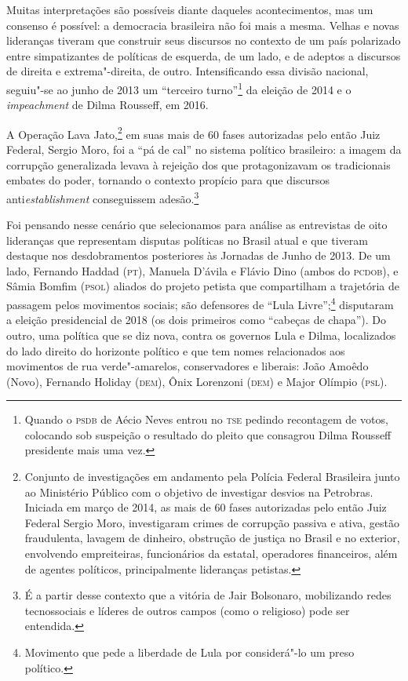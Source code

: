 Muitas interpretações são possíveis diante daqueles acontecimentos, mas
um consenso é possível: a democracia brasileira não foi mais a mesma.
Velhas e novas lideranças tiveram que construir seus discursos no
contexto de um país polarizado entre simpatizantes de políticas de
esquerda, de um lado, e de adeptos a discursos de direita e
extrema"-direita, de outro. Intensificando essa divisão nacional,
seguiu"-se ao junho de 2013 um ``terceiro turno''\footnote{Quando o \textsc{psdb} de
  Aécio Neves entrou no \textsc{tse} pedindo recontagem de votos, colocando sob
  suspeição o resultado do pleito que consagrou Dilma Rousseff
  presidente mais uma vez.} da eleição de 2014 e o \emph{impeachment}
de Dilma Rousseff, em 2016.

A Operação Lava Jato,\footnote{Conjunto de investigações em andamento
  pela Polícia Federal Brasileira junto ao Ministério Público com o
  objetivo de investigar desvios na Petrobras. Iniciada em março de
  2014, as mais de 60 fases autorizadas pelo então Juiz Federal Sergio
  Moro, investigaram crimes de corrupção passiva e ativa, gestão
  fraudulenta, lavagem de dinheiro, obstrução de justiça no Brasil e no
  exterior, envolvendo empreiteiras, funcionários da estatal, operadores
  financeiros, além de agentes políticos, principalmente lideranças
  petistas.} em suas mais de 60 fases autorizadas pelo então Juiz
Federal, Sergio Moro, foi a ``pá de cal'' no sistema político
brasileiro: a imagem da corrupção generalizada levava à rejeição dos que
protagonizavam os tradicionais embates do poder, tornando o contexto
propício para que discursos anti\emph{establishment} conseguissem
adesão.\footnote{É a partir desse contexto que a vitória de Jair
  Bolsonaro, mobilizando redes tecnossociais e líderes de outros campos
  (como o religioso) pode ser entendida.}

Foi pensando nesse cenário que selecionamos para análise as entrevistas
de oito lideranças que representam disputas políticas no Brasil atual e
que tiveram destaque nos desdobramentos posteriores às Jornadas de Junho
de 2013. De um lado, Fernando Haddad (\textsc{pt}), Manuela D'ávila e Flávio Dino
(ambos do \textsc{pcdob}), e Sâmia Bomfim (\textsc{psol}) aliados do projeto petista que
compartilham a trajetória de passagem pelos movimentos sociais; são
defensores de ``Lula Livre'';\footnote{Movimento que pede a liberdade de
  Lula por considerá"-lo um preso político.} disputaram a eleição
presidencial de 2018 (os dois primeiros como ``cabeças de chapa''). Do
outro, uma política que se diz nova, contra os governos Lula e Dilma,
localizados do lado direito do horizonte político e que tem nomes
relacionados aos movimentos de rua verde"-amarelos, conservadores e
liberais: João Amoêdo (Novo), Fernando Holiday (\textsc{dem}), Ônix Lorenzoni
(\textsc{dem}) e Major Olímpio (\textsc{psl}).

